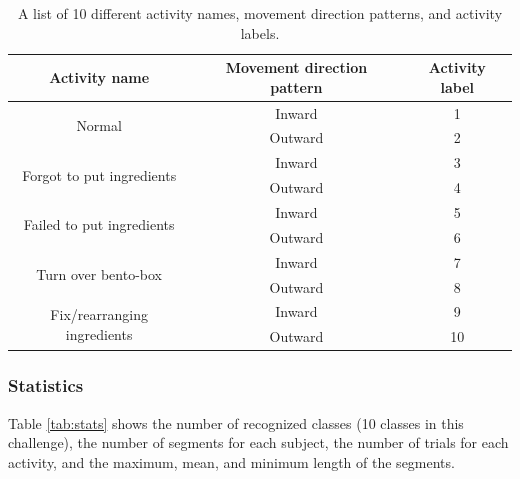 \documentclass[graybox]{svmult}
\begin{document}
\begin{table}[h]
    \centering
    \caption{A list of 10 different activity names, movement direction patterns, and activity labels.}
    \begin{tabular}{c|c|c}\hline\hline
    Activity name & Movement direction pattern & Activity label \\ \hline
    \multirow{2}{*}{Normal} & Inward & 1 \\ \cline{2-3}
    & Outward & 2 \\ \hline
    \multirow{2}{*}{Forgot to put ingredients} & Inward & 3 \\ \cline{2-3}
    & Outward & 4 \\ \hline
    \multirow{2}{*}{Failed to put ingredients} & Inward & 5 \\ \cline{2-3}
    & Outward & 6 \\ \hline
    \multirow{2}{*}{Turn over bento-box} & Inward & 7 \\ \cline{2-3}
    & Outward & 8 \\ \hline
    \multirow{2}{*}{Fix/rearranging ingredients} & Inward & 9 \\ \cline{2-3}
    & Outward & 10 \\ \hline
    \end{tabular}
    \label{tab:activity}
\end{table}

\subsubsection{Statistics}
Table \ref{tab:stats} shows the number of recognized classes (10 classes in this challenge), the number of segments for each subject, the number of trials for each activity, and the maximum, mean, and minimum length of the segments.
\end{document}
